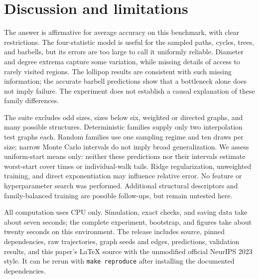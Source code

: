 \documentclass{article}
\begin{document}
\section{Discussion and limitations}
The answer is affirmative for average accuracy on this benchmark, with clear restrictions. The four-statistic model is useful for the sampled paths, cycles, trees, and barbells, but its errors are too large to call it uniformly reliable. Diameter and degree extrema capture some variation, while missing details of access to rarely visited regions. The lollipop results are consistent with such missing information; the accurate barbell predictions show that a bottleneck alone does not imply failure. The experiment does not establish a causal explanation of these family differences.

The suite excludes odd sizes, sizes below six, weighted or directed graphs, and many possible structures. Deterministic families supply only two interpolation test graphs each. Random families use one sampling regime and ten draws per size; narrow Monte Carlo intervals do not imply broad generalization. We assess uniform-start means only: neither these predictions nor their intervals estimate worst-start cover times or individual-walk tails. Ridge regularization, unweighted training, and direct exponentiation may influence relative error. No feature or hyperparameter search was performed. Additional structural descriptors and family-balanced training are possible follow-ups, but remain untested here.

All computation uses CPU only. Simulation, exact checks, and saving data take about seven seconds; the complete experiment, bootstrap, and figures take about twenty seconds on this environment. The release includes source, pinned dependencies, raw trajectories, graph seeds and edges, predictions, validation results, and this paper's LaTeX source with the unmodified official NeurIPS 2023 style. It can be rerun with \texttt{make reproduce} after installing the documented dependencies.



\end{document}
